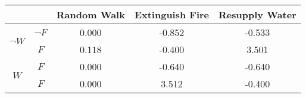 \begin{center}
\begin{tabular}{|c|c|c|c|c|}
  \hline
  &   & Random Walk & Extinguish Fire & Resupply Water\\
  \hline
  \multirow{2}{*}{$\neg W$} & $\neg F$ & 0.000 & -0.852 & -0.533\\
  \cline{2-5}
   & $F$ & 0.118 & -0.400 & 3.501\\
  \hline
  \multirow{2}{*}{$W$} & $F$ & 0.000 & -0.640 & -0.640\\
  \cline{2-5}
   & $F$ & 0.000 & 3.512 & -0.400\\
  \hline
\end{tabular}
\end{center}
